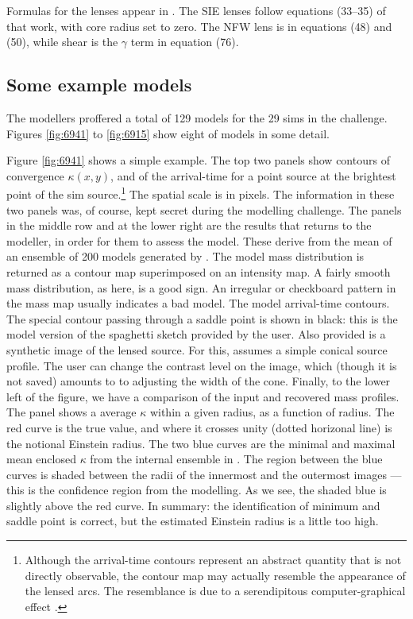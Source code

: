 Formulas for the lenses appear in \cite{2001astro.ph..2341K}. The SIE
lenses follow equations (33--35) of that work, with core radius set to
zero.  The NFW lens is in equations (48) and (50), while shear is the
$\gamma$ term in equation (76).

\subsection{Some example models} \label{sec:example_models}

The modellers proffered a total of 129 models for the 29 sims in the
challenge.  Figures \ref{fig:6941} to \ref{fig:6915} show eight of
models in some detail.

Figure \ref{fig:6941} shows a simple example.  The top two panels show
contours of convergence $\kappa(x,y)$, and of the arrival-time for a
point source at the brightest point of the sim
source.\footnote{Although the arrival-time contours represent an
  abstract quantity that is not directly observable, the contour map
  may actually resemble the appearance of the lensed arcs.  The
  resemblance is due to a serendipitous computer-graphical effect
  \citep{2001AJ....122..585S}.} The spatial scale is in pixels.  The
information in these two panels was, of course, kept secret during the
modelling challenge.  The panels in the middle row and at the lower
right are the results that \spl returns to the modeller, in order for
them to assess the model.  These derive from the mean of an ensemble
of 200 models generated by \spl.  The model mass distribution is
returned as a contour map superimposed on an intensity map. A fairly
smooth mass distribution, as here, is a good sign.  An irregular or
checkboard pattern in the mass map usually indicates a bad model.  The
model arrival-time contours.  The special contour passing through a
saddle point is shown in black: this is the model version of the
spaghetti sketch provided by the user.  Also provided is a synthetic
image of the lensed source.  For this, \spl assumes a simple conical
source profile.  The user can change the contrast level on the image,
which (though it is not saved) amounts to to adjusting the width of
the cone.  Finally, to the lower left of the figure, we have a
comparison of the input and recovered mass profiles.  The panel shows
a average $\kappa$ within a given radius, as a function of radius.
The red curve is the true value, and where it crosses unity (dotted
horizonal line) is the notional Einstein radius.  The two blue curves
are the minimal and maximal mean enclosed $\kappa$ from the internal
ensemble in \spl.  The region between the blue curves is shaded
between the radii of the innermost and the outermost images --- this
is the confidence region from the modelling.  As we see, the shaded
blue is slightly above the red curve.  In summary: the identification
of minimum and saddle point is correct, but the estimated Einstein
radius is a little too high.

